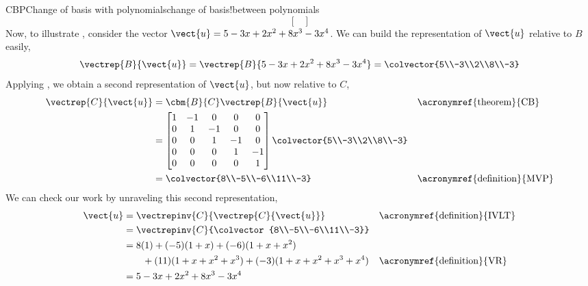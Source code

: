 \begin{example}{CBP}{Change of basis with polynomials}{change of basis!between polynomials}
\begin{equation*}
\begin{bmatrix}
\end{bmatrix}
\end{equation*}
%
Now, to illustrate , consider the vector $\vect{u}=5-3x+2x^2+8x^3-3x^4$.  We can build the representation of $\vect{u}$ relative to $B$ easily,
%
\begin{equation*}
%
\vectrep{B}{\vect{u}}=
\vectrep{B}{5-3x+2x^2+8x^3-3x^4}=
\colvector{5\\-3\\2\\8\\-3}
%
\end{equation*}
%
Applying , we obtain a second representation of $\vect{u}$, but now relative to $C$,
%
\begin{align*}
\vectrep{C}{\vect{u}}
&=\cbm{B}{C}\vectrep{B}{\vect{u}}&&\text{\acronymref{theorem}{CB}}\\
%
&=
\begin{bmatrix}
1 &-1 & 0 & 0 & 0\\
0 & 1 &-1 & 0 & 0\\
0 & 0 & 1 &-1 & 0\\
0 & 0 & 0 & 1 &-1\\
0 & 0 & 0 & 0 & 1\\
\end{bmatrix}
\colvector{5\\-3\\2\\8\\-3}\\
%
&=\colvector{8\\-5\\-6\\11\\-3}&&\text{\acronymref{definition}{MVP}}
%
\end{align*}
%
We can check our work by unraveling this second representation,
%
\begin{align*}
\vect{u}
%
&=\vectrepinv{C}{\vectrep{C}{\vect{u}}}
&&\text{\acronymref{definition}{IVLT}}\\
%
&=\vectrepinv{C}{\colvector{8\\-5\\-6\\11\\-3}}\\
%
&=8(1)+(-5)(1+x)+(-6)(1+x+x^2)\\
&\quad\quad+(11)(1+x+x^2+x^3)+(-3)(1+x+x^2+x^3+x^4)
&&\text{\acronymref{definition}{VR}}\\
%
&=5-3x+2x^2+8x^3-3x^4

\end{align*}
\end{example}

